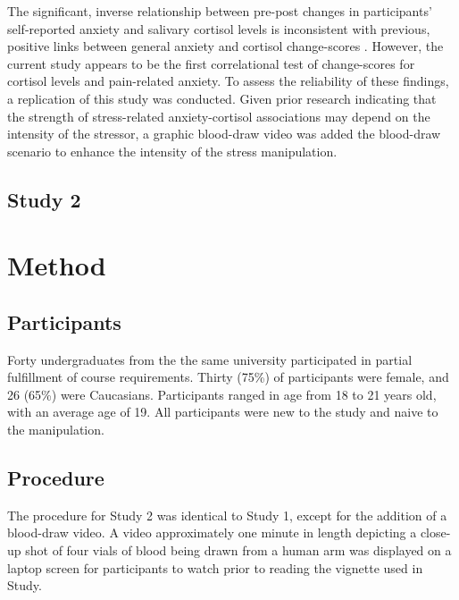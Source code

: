 \documentclass[review]{elsarticle}\usepackage[]{graphicx}\usepackage[]{color}
\begin{document}
The significant, inverse relationship between pre-post changes in participants' self-reported anxiety and salivary cortisol levels is inconsistent with previous, positive links between general anxiety and cortisol change-scores \cite{alpers2003salivary,sachar1970cortisol}.
However, the current study appears to be the first correlational test of change-scores for cortisol levels and pain-related anxiety.
To assess the reliability of these findings, a replication of this study was conducted. 
Given prior research indicating that the strength of stress-related anxiety-cortisol associations may depend on the intensity of the stressor, a graphic blood-draw video was added the blood-draw scenario to enhance the intensity of the stress manipulation.

\begin{center}
\section*{Study 2}
\label{sec:study2}
\end{center}

\section*{Method}
\label{sec:method2}

\subsection*{Participants}
\label{sub:participants2}

Forty undergraduates from the the same university participated in partial fulfillment of course requirements.
Thirty (75\%) of participants were female, and 26 (65\%) were Caucasians.
Participants ranged in age from 18 to 21 years old, with an average age of 19.
All participants were new to the study and naive to the manipulation.

\subsection*{Procedure}
\label{sub:procedure2}

The procedure for Study 2 was identical to Study 1, except for the addition of a blood-draw video.
A video approximately one minute in length depicting a close-up shot of four vials of blood being drawn from a human arm was displayed on a laptop screen for participants to watch prior to reading the vignette used in Study.
\end{document}
